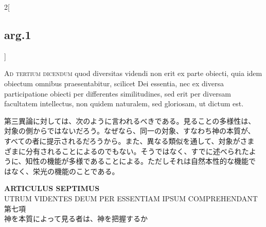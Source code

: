 \documentclass[paper=a4paper,fontsize=10pt,jafontsize=9pt,titlepage]{jlreq}
\begin{document}
\begin{paracol}{2}[\subsection{arg.1}]
\switchcolumn*[\subsection{ad.3}]

{\scshape Ad tertium dicendum} quod diversitas videndi non erit ex parte
obiecti, quia idem obiectum omnibus praesentabitur, scilicet Dei
essentia, nec ex diversa participatione obiecti per differentes
similitudines, sed erit per diversam facultatem intellectus, non
quidem naturalem, sed gloriosam, ut dictum est.

\switchcolumn

第三異論に対しては、次のように言われるべきである。見ることの多様性は、
対象の側からではないだろう。なぜなら、同一の対象、すなわち神の本質が、
すべての者に提示されるだろうから。また、異なる類似を通して、対象がさま
ざまに分有されることによるのでもない。そうではなく、すでに述べられたよ
うに、知性の機能が多様であることによる。ただしそれは自然本性的な機能で
はなく、栄光の機能のことである。

\end{paracol}
\newpage

\begin{center}
 {\Large {\bfseries ARTICULUS SEPTIMUS}}\\
{\large UTRUM VIDENTES DEUM PER ESSENTIAM IPSUM COMPREHENDANT\\
第七項\\
神を本質によって見る者は、神を把握するか}
\end{center}
{}
\setcounter{section}{7}
\setcounter{subsection}{0}
\end{document}
